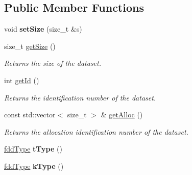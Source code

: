 \subsection*{Public Member Functions}
\begin{DoxyCompactItemize}
\item 
\hypertarget{classfaster_1_1fddBase_a41699519e9774d380bd0053f3d3b995a}{}\label{classfaster_1_1fddBase_a41699519e9774d380bd0053f3d3b995a} 
void {\bfseries set\+Size} (size\+\_\+t \&s)
\item 
\hypertarget{classfaster_1_1fddBase_ab9645c31245a53f97449446a440adf47}{}\label{classfaster_1_1fddBase_ab9645c31245a53f97449446a440adf47} 
size\+\_\+t \hyperlink{classfaster_1_1fddBase_ab9645c31245a53f97449446a440adf47}{get\+Size} ()
\begin{DoxyCompactList}\small\item\em Returns the size of the dataset. \end{DoxyCompactList}\item 
\hypertarget{classfaster_1_1fddBase_a3902296c393cb15e830c02555a0f371f}{}\label{classfaster_1_1fddBase_a3902296c393cb15e830c02555a0f371f} 
int \hyperlink{classfaster_1_1fddBase_a3902296c393cb15e830c02555a0f371f}{get\+Id} ()
\begin{DoxyCompactList}\small\item\em Returns the identification number of the dataset. \end{DoxyCompactList}\item 
\hypertarget{classfaster_1_1fddBase_a2b6f4b4fa670e90cde938d456e5da3b7}{}\label{classfaster_1_1fddBase_a2b6f4b4fa670e90cde938d456e5da3b7} 
const std\+::vector$<$ size\+\_\+t $>$ \& \hyperlink{classfaster_1_1fddBase_a2b6f4b4fa670e90cde938d456e5da3b7}{get\+Alloc} ()
\begin{DoxyCompactList}\small\item\em Returns the allocation identification number of the dataset. \end{DoxyCompactList}\item 
\hypertarget{classfaster_1_1fddBase_a640157513b4752863e877391de92ede4}{}\label{classfaster_1_1fddBase_a640157513b4752863e877391de92ede4} 
\hyperlink{namespacefaster_aa8898687bc64536b60a3d5f365060cd6}{fdd\+Type} {\bfseries t\+Type} ()
\item 
\hypertarget{classfaster_1_1fddBase_a18c8bafa38afa84895db3c27c0416187}{}\label{classfaster_1_1fddBase_a18c8bafa38afa84895db3c27c0416187} 
\hyperlink{namespacefaster_aa8898687bc64536b60a3d5f365060cd6}{fdd\+Type} {\bfseries k\+Type} ()
\item 

\end{DoxyCompactItemize}
